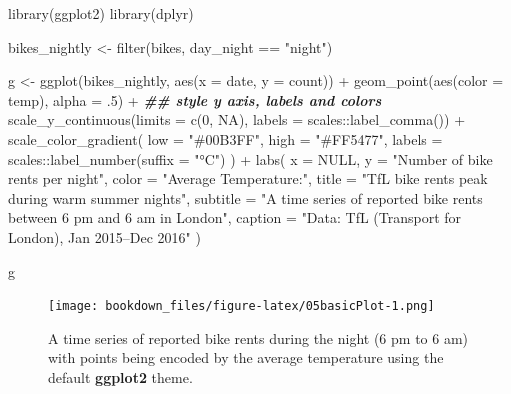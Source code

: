 \documentclass[
]{krantz}
\makeatletter
\newenvironment{Shaded}{\begin{snugshade}}{\end{snugshade}}
\newcommand{\AttributeTok}[1]{\textcolor[rgb]{0.61,0.61,0.61}{#1}}
\newcommand{\ConstantTok}[1]{\textcolor[rgb]{0,0,0}{#1}}
\newcommand{\DecValTok}[1]{\textcolor[rgb]{0.06,0.06,0.06}{#1}}
\newcommand{\DocumentationTok}[1]{\textcolor[rgb]{0.37,0.37,0.37}{\textbf{\textit{#1}}}}
\newcommand{\FunctionTok}[1]{\textcolor[rgb]{0,0,0}{#1}}
\newcommand{\NormalTok}[1]{#1}
\newcommand{\OtherTok}[1]{\textcolor[rgb]{0.37,0.37,0.37}{#1}}
\newcommand{\SpecialCharTok}[1]{\textcolor[rgb]{0,0,0}{#1}}
\newcommand{\StringTok}[1]{\textcolor[rgb]{0.5,0.5,0.5}{#1}}
\newenvironment{kframe}{%
\medskip{}
\setlength{\fboxsep}{.8em}
 \def\at@end@of@kframe{}%
 \ifinner\ifhmode%
  \def\at@end@of@kframe{\end{minipage}}%
  \begin{minipage}{\columnwidth}%
 \fi\fi%
 \def\FrameCommand##1{\hskip\@totalleftmargin \hskip-\fboxsep
 \colorbox{shadecolor}{##1}\hskip-\fboxsep
     \hskip-\linewidth \hskip-\@totalleftmargin \hskip\columnwidth}%
 \MakeFramed {\advance\hsize-\width
   \@totalleftmargin\z@ \linewidth\hsize
   \@setminipage}}%
 {\par\unskip\endMakeFramed%
 \at@end@of@kframe}
\renewenvironment{Shaded}{\begin{kframe}}{\end{kframe}}
\makeatother
\begin{document}
\begin{Shaded}
\begin{Highlighting}[]
\FunctionTok{library}\NormalTok{(ggplot2)}
\FunctionTok{library}\NormalTok{(dplyr)}

\NormalTok{bikes\_nightly }\OtherTok{\textless{}{-}} \FunctionTok{filter}\NormalTok{(bikes, day\_night }\SpecialCharTok{==} \StringTok{"night"}\NormalTok{)}

\NormalTok{g }\OtherTok{\textless{}{-}} 
  \FunctionTok{ggplot}\NormalTok{(bikes\_nightly, }\FunctionTok{aes}\NormalTok{(}\AttributeTok{x =}\NormalTok{ date, }\AttributeTok{y =}\NormalTok{ count)) }\SpecialCharTok{+} 
  \FunctionTok{geom\_point}\NormalTok{(}\FunctionTok{aes}\NormalTok{(}\AttributeTok{color =}\NormalTok{ temp), }\AttributeTok{alpha =}\NormalTok{ .}\DecValTok{5}\NormalTok{) }\SpecialCharTok{+}
  \DocumentationTok{\#\# style y axis, labels and colors}
  \FunctionTok{scale\_y\_continuous}\NormalTok{(}\AttributeTok{limits =} \FunctionTok{c}\NormalTok{(}\DecValTok{0}\NormalTok{, }\ConstantTok{NA}\NormalTok{), }\AttributeTok{labels =}\NormalTok{ scales}\SpecialCharTok{::}\FunctionTok{label\_comma}\NormalTok{()) }\SpecialCharTok{+}
  \FunctionTok{scale\_color\_gradient}\NormalTok{(}
    \AttributeTok{low =} \StringTok{"\#00B3FF"}\NormalTok{, }\AttributeTok{high =} \StringTok{"\#FF5477"}\NormalTok{, }
    \AttributeTok{labels =}\NormalTok{ scales}\SpecialCharTok{::}\FunctionTok{label\_number}\NormalTok{(}\AttributeTok{suffix =} \StringTok{"°C"}\NormalTok{)}
\NormalTok{  ) }\SpecialCharTok{+}
  \FunctionTok{labs}\NormalTok{(}
    \AttributeTok{x =} \ConstantTok{NULL}\NormalTok{, }\AttributeTok{y =} \StringTok{"Number of bike rents per night"}\NormalTok{, }\AttributeTok{color =} \StringTok{"Average Temperature:"}\NormalTok{,}
    \AttributeTok{title =} \StringTok{"TfL bike rents peak during warm summer nights"}\NormalTok{,}
    \AttributeTok{subtitle =} \StringTok{"A time series of reported bike rents between 6 pm and 6 am in London"}\NormalTok{,}
    \AttributeTok{caption =} \StringTok{"Data: TfL (Transport for London), Jan 2015–Dec 2016"}
\NormalTok{  ) }

\NormalTok{g}
\end{Highlighting}
\end{Shaded}

\begin{figure}
\centering
\texttt{[image: bookdown\_files/figure-latex/05basicPlot-1.png]}
\caption{\label{fig:05basicPlot}A time series of reported bike rents during the night (6 pm to 6 am) with points being encoded by the average temperature using the default \textbf{ggplot2} theme.}
\end{figure}
\end{document}
